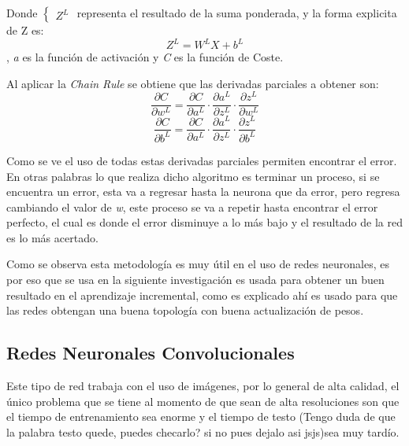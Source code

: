             Donde 
            $\begin{cases}
                Z^L
            \end{cases}$
            representa el resultado de la suma ponderada, y la forma explicita de Z es:
            \begin{equation*}
                Z^L = W^LX + b^L
            \end{equation*}
            , \textit{a} es la funci\'on de activaci\'on 
            y \textit{C} es la funci\'on de Coste.

            Al aplicar la \textit{Chain Rule} se obtiene que las derivadas parciales a obtener son:
            \begin{equation*}
                \frac{\partial C}{\partial w^L} = \frac{\partial C}{\partial a^L} \cdot \frac{\partial a^L}{\partial z^L} \cdot \frac{\partial z^L}{\partial w^L} 
            \end{equation*}
            \begin{equation*}
                \frac{\partial C}{\partial b^L} = \frac{\partial C}{\partial a^L} \cdot \frac{\partial a^L}{\partial z^L} \cdot \frac{\partial z^L}{\partial b^L}
            \end{equation*}

            Como se ve el uso de todas estas derivadas parciales permiten encontrar el error.
            En otras palabras lo que realiza dicho algoritmo es terminar un proceso, si se encuentra un error, esta va a regresar
            hasta la neurona que da error, pero regresa cambiando el valor de \textit{w}, este proceso se va a 
            repetir hasta encontrar el error perfecto, el cual es donde el error disminuye a lo m\'as bajo y el resultado
            de la red es lo m\'as acertado.

            Como se observa esta metodolog\'ia es muy \'util en el uso de redes neuronales, es por eso que 
            se usa en la siguiente investigaci\'on \cite{bullinaria2009} es usada para obtener un buen resultado
            en el aprendizaje incremental, como es explicado ah\'i es usado para que las redes obtengan una buena topolog\'ia con 
            buena actualizaci\'on de pesos.

        \subsection{Redes Neuronales Convolucionales}

            Este tipo de red trabaja con el uso de imágenes, por lo general de alta calidad, el \'unico problema que se tiene 
            al momento de que sean de alta resoluciones son que el tiempo de entrenamiento sea enorme y el tiempo de testo (Tengo duda de que la palabra testo quede, puedes checarlo? si no pues dejalo asi jsjs)sea muy tardío.


